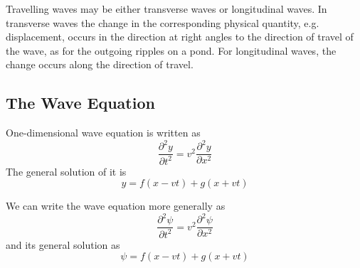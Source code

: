 \documentclass[../../../main.tex]{subfiles}
\begin{document}
Travelling waves may be either transverse waves or longitudinal waves. In transverse waves the change in the corresponding physical quantity, e.g. displacement, occurs in the direction at right angles to the direction of travel of the wave, as for the outgoing ripples on a pond. For longitudinal waves, the change occurs along the direction of travel. 

\subsection{The Wave Equation}
One-dimensional wave equation is written as 
\begin{equation*}
    \frac{\partial^2 y}{\partial t^2}= v^2 \frac{\partial^2 y}{\partial x^2}
\end{equation*}
The general solution of it is 
\begin{equation*}
    y = f (x - vt) + g(x + vt)
\end{equation*}

We can write the wave equation more generally as
\begin{equation*}
    \frac{\partial^2 \psi}{\partial t^2}= v^2 \frac{\partial^2 \psi}{\partial x^2}
\end{equation*}
and its general solution as
\begin{equation*}
    \psi=f (x - vt) + g(x + vt)
\end{equation*}
\end{document}
